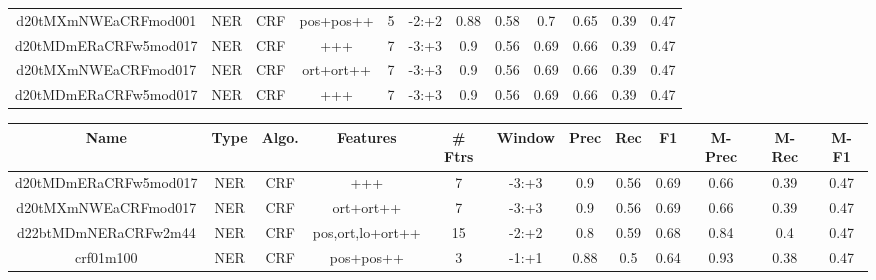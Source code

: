 \documentclass[a4paper]{article}
\begin{document}
\begin{landscape}
\begin{center}
\begin{tabular}{ |c|c|c|c|c|c|c|c|c|c|c|c|}
 
 	
 	\small{ d20tMXmNWEaCRFmod001 } & \small{ NER} & \small{  CRF }  & pos+pos++  &  5 &  \small{  -2:+2 }  &  0.88 & 0.58 & 0.7  &  0.65 & 0.39 & 0.47 \\
 	

 
 	
 	\small{ d20tMDmERaCRFw5mod017 } & \small{ NER} & \small{  CRF }  & +++  &  7 &  \small{  -3:+3 }  &  0.9 & 0.56 & 0.69  &  0.66 & 0.39 & 0.47 \\
 	

 
 	
 	\small{ d20tMXmNWEaCRFmod017 } & \small{ NER} & \small{  CRF }  & ort+ort++  &  7 &  \small{  -3:+3 }  &  0.9 & 0.56 & 0.69  &  0.66 & 0.39 & 0.47 \\
 	

 
 	
 	\small{ d20tMDmERaCRFw5mod017 } & \small{ NER} & \small{  CRF }  & +++  &  7 &  \small{  -3:+3 }  &  0.9 & 0.56 & 0.69  &  0.66 & 0.39 & 0.47 \\
 	
 \hline
\end{tabular}
\end{center}




\begin{center}
\begin{tabular}{ |c|c|c|c|c|c|c|c|c|c|c|c|} 
 \hline
 	Name & Type & Algo. & Features & \# Ftrs & Window & Prec & Rec & F1 & M-Prec & M-Rec & M-F1\\
 \hline

 	

 
 	
 	\small{ d20tMDmERaCRFw5mod017 } & \small{ NER} & \small{  CRF }  & +++  &  7 &  \small{  -3:+3 }  &  0.9 & 0.56 & 0.69  &  0.66 & 0.39 & 0.47 \\
 	

 
 	
 	\small{ d20tMXmNWEaCRFmod017 } & \small{ NER} & \small{  CRF }  & ort+ort++  &  7 &  \small{  -3:+3 }  &  0.9 & 0.56 & 0.69  &  0.66 & 0.39 & 0.47 \\
 	

 
 	
 	\small{ d22btMDmNERaCRFw2m44 } & \small{ NER} & \small{  CRF }  & pos,ort,lo+ort++  &  15 &  \small{  -2:+2 }  &  0.8 & 0.59 & 0.68  &  0.84 & 0.4 & 0.47 \\
 	

 
 	
 	\small{ crf01m100 } & \small{ NER} & \small{  CRF }  & pos+pos++  &  3 &  \small{  -1:+1 }  &  0.88 & 0.5 & 0.64  &  0.93 & 0.38 & 0.47 \\
 	


\end{tabular}
\end{center}
\end{landscape}
\end{document}
